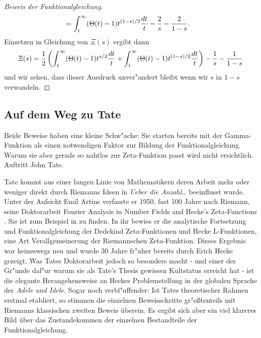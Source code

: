 \begin{proof}[Beweis der Funktionalgleichung]
\begin{align*}
				&= \int_{1}^{\infty} (\Theta(t) - 1) t^{(1-s)/2}  \frac{\dx[t]}{t} - \frac{2}{s} - \frac{2}{1-s}.
		\end{align*}
		Einsetzen in Gleichung von $\Xi(s)$ ergibt dann
		\begin{align*}
			\Xi(s)
				= \frac{1}{2} \left( \int_{1}^{\infty} (\Theta(t) - 1) t^{s/2}  \frac{\dx[t]}{t} + \int_{1}^{\infty} (\Theta(t) - 1) t^{(1-s)/2}  \frac{\dx[t]}{t} \right)  - \frac{1}{s} - \frac{1}{1-s}
		\end{align*}
		und wir sehen, dass dieser Ausdruck unver"andert bleibt wenn wir $s$ in $1-s$ verwandeln.
	\end{proof}

\subsection{Auf dem Weg zu Tate}
	Beide Beweise haben eine kleine Schw"ache: Sie starten bereits mit der Gamma-Funktion als einen notwendigen Faktor zur Bildung der Funktionalgleichung.
	Warum sie aber gerade so nahtlos zur Zeta-Funktion passt wird nicht ersichtlich. 
	Auftritt John Tate.
	
	Tate kommt aus einer langen Linie von Mathematikern deren Arbeit mehr oder weniger direkt durch Riemanns Ideen in  \emph{Ueber die Anzahl\dots} beeinflusst wurde.
	Unter der Aufsicht Emil Artins verfasste er 1950, fast 100 Jahre nach Riemann, seine Doktorarbeit \glqq Fourier Analysis in Number Fields and Hecke's Zeta-Functions\grqq{} \cite{tate}. Sie ist zum Beispiel in \cite{cassels1967algebraic} zu finden.
	In ihr bewies er die analytische Fortsetzung und Funktionalgleichung der Dedekind Zeta-Funktionen und Hecke L-Funktionen, eine Art Verallgemeinerung der Riemannschen Zeta-Funktion.
	Dieses Ergebnis war keineswegs neu und wurde 30 Jahre fr"uher bereits durch Erich Hecke gezeigt.
	Was Tates Doktorarbeit jedoch so besonders macht - und einer der Gr"unde daf"ur warum sie als  \glqq Tate's Thesis\grqq{} gewissen Kultstatus erreicht hat - ist die elegante Herangehensweise an Heckes Problemstellung in der globalen Sprache der \emph{Adele und Idele}.
	Sogar noch verbl"uffender: Ist Tates theoretischer Rahmen erstmal etabliert, so stimmen die einzelnen Beweisschritte gr"oßtenteils mit Riemanns klassischen zweiten Beweis überein.
	Es ergibt sich aber ein viel klareres Bild über das Zustandekommen der einzelnen Bestandteile der Funktionalgleichung.
	
